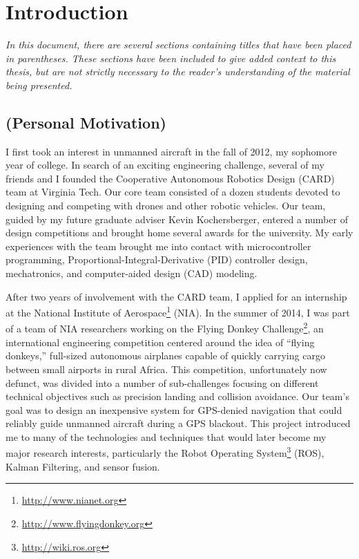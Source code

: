 \chapter{Introduction}

\textit{In this document, there are several sections containing titles that have been placed in parentheses. These sections have been included to give added context to this thesis, but are not strictly necessary to the reader's understanding of the material being presented.}

\section{(Personal Motivation)}

I first took an interest in unmanned aircraft in the fall of 2012, my sophomore year of college. In search of an exciting engineering challenge, several of my friends and I founded the Cooperative Autonomous Robotics Design (CARD) team at Virginia Tech. Our core team consisted of a dozen students devoted to designing and competing with drones and other robotic vehicles. Our team, guided by my future graduate adviser Kevin Kochersberger, entered a number of design competitions and brought home several awards for the university. My early experiences with the team brought me into contact with microcontroller programming, Proportional-Integral-Derivative (PID) controller design, mechatronics, and computer-aided design (CAD) modeling.

After two years of involvement with the CARD team, I applied for an internship at the National Institute of Aerospace\footnote{\url{http://www.nianet.org}} (NIA). In the summer of 2014, I was part of a team of NIA researchers working on the Flying Donkey Challenge\footnote{\url{http://www.flyingdonkey.org}}, an international engineering competition centered around the idea of ``flying donkeys,'' full-sized autonomous airplanes capable of quickly carrying cargo between small airports in rural Africa. This competition, unfortunately now defunct, was divided into a number of sub-challenges focusing on different technical objectives such as precision landing and collision avoidance. Our team's goal was to design an inexpensive system for GPS-denied navigation that could reliably guide unmanned aircraft during a GPS blackout. This project introduced me to many of the technologies and techniques that would later become my major research interests, particularly the Robot Operating System\footnote{\url{http://wiki.ros.org}} (ROS), Kalman Filtering, and sensor fusion.

